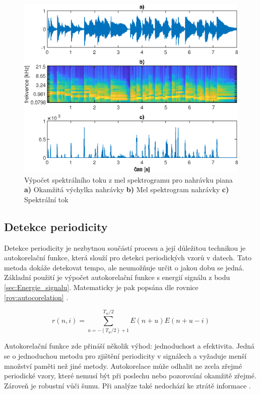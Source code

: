   \begin{figure}[H]
    \centering
    \includegraphics[width = 0.8\linewidth]{obrazky/Mel_spektralni_tok.eps}
    \caption{Výpočet spektrálního toku z mel spektrogramu pro nahrávku piana \textbf{a)} Okamžitá výchylka nahrávky \textbf{b)} Mel spektrogram nahrávky \textbf{c)} Spektrální tok}
    \label{fig:Mel_spectralni_tok}
  \end{figure}

  \subsection{Detekce periodicity}
    Detekce periodicity je nezbytnou součástí procesu a její důležitou technikou je autokorelační funkce, která slouží pro detekci periodických vzorů v datech.
    Tato metoda dokáže detekovat tempo, ale neumožňuje určit o jakou dobu se jedná.
    Základní použití je výpočet autokorelační funkce s energií signálu z bodu \ref{sec:Energie_signalu}. Matematicky je pak popsána dle rovnice \ref{rov:autocorelation} \cite{Signal_processing_methods_for_music_transcription}.

    \begin{equation}
      r(n,i) = \sum_{u = -(T_w / 2) + 1}^{T_w / 2} E(n+u)E(n+u-i)
      \label{rov:autocorelation}
    \end{equation}

    Autokorelační funkce zde přináší několik výhod: jednoduchost a efektivita. Jedná se o jednoduchou metodu pro zjištění periodicity v signálech a vyžaduje menší množství paměti než jiné metody. Autokorelace může odhalit ne zcela zřejmé periodické vzory, které nemusí být při poslechu nebo pozorování okamžitě zřejmé. Zároveň je robustní vůči šumu. Při analýze také nedochází ke ztrátě informace \cite{Tempo_and_metrical_analzsis_by_tracking_multiple_metrical_levels_using_autocorrelation}.
    

